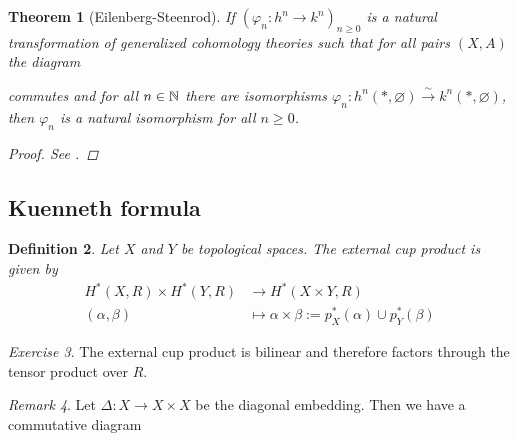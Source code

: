 \documentclass[A4paper, british]{amsart}
\theoremstyle{darkgreentheorem}
\newtheorem{thm}{Theorem}[section]
\theoremstyle{darkbluedefinition}
\newtheorem{defn}[thm]{Definition}
\theoremstyle{darkredexample}
\theoremstyle{remark}
\newtheorem{rem}[thm]{Remark}
\newtheorem{exe}[thm]{Exercise}
\newcommand{\1}{\mathbbm{1}}
\newcommand{\ot}{\otimes}
\newcommand{\tms}{\times}
\begin{document}
\begin{thm}[Eilenberg-Steenrod]
    If $(\varphi_{n}\colon h^{n}\to k^{n})_{n\geqslant 0}$ is a natural transformation of generalized cohomology theories such that for all pairs $(X,A)$ the diagram
    \begin{center}
    \end{center}
    commutes and for all $n\in \mathbb{N}$ there are isomorphisms $\varphi_{n}\colon h^{n}(*,\varnothing)\xrightarrow{\sim} k^{n}(*,\varnothing)$, then $\varphi_{n}$ is a natural isomorphism for all $n\geqslant 0$.
    \begin{proof}
	See \cite[Theorem 3.19]{hat01}.
    \end{proof}
\end{thm}

\subsection{Kuenneth formula}

\begin{defn}
    Let $X$ and $Y$ be topological spaces.
    The \textit{external cup product} is given by
    \begin{align*}
	H^{*}(X,R)\times H^{*}(Y,R) & \longrightarrow H^{*}(X\times Y,R) \\
	(\alpha,\beta) & \longmapsto \alpha\tms \beta:= p_{X}^{*}(\alpha)\cup p_{Y}^{*}(\beta)
    \end{align*}
\end{defn}

\begin{exe}
    The external cup product is bilinear and therefore factors through the tensor product over $R$.
\end{exe}

\begin{rem}
    Let $\Delta\colon X\to X\tms X$ be the diagonal embedding.
    Then we have a commutative diagram
    \begin{center}
    \end{center}
\end{rem}
\end{document}

